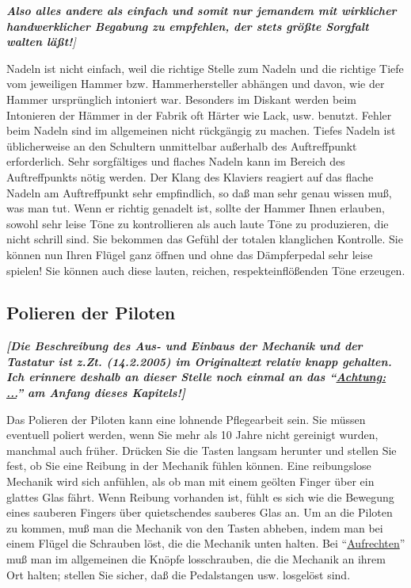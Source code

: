 \textit{\textbf{Also alles andere als einfach und somit nur jemandem mit wirklicher handwerklicher Begabung zu empfehlen, der stets größte Sorgfalt walten läßt!}]}

Nadeln ist nicht einfach, weil die richtige Stelle zum Nadeln und die richtige Tiefe vom jeweiligen Hammer bzw. Hammerhersteller abhängen und davon, wie der Hammer ursprünglich intoniert war.
 Besonders im Diskant werden beim Intonieren der Hämmer in der Fabrik oft Härter wie Lack, usw. benutzt.
 Fehler beim Nadeln sind im allgemeinen nicht rückgängig zu machen.
 Tiefes Nadeln ist üblicherweise an den Schultern unmittelbar außerhalb des Auftreffpunkt erforderlich.
 Sehr sorgfältiges und flaches Nadeln kann im Bereich des Auftreffpunkts nötig werden.
 Der Klang des Klaviers reagiert auf das flache Nadeln am Auftreffpunkt sehr empfindlich, so daß man sehr genau wissen muß, was man tut.
 Wenn er richtig genadelt ist, sollte der Hammer Ihnen erlauben, sowohl sehr leise Töne zu kontrollieren als auch laute Töne zu produzieren, die nicht schrill sind.
 Sie bekommen das Gefühl der totalen klanglichen Kontrolle.
 Sie können nun Ihren Flügel ganz öffnen und ohne das Dämpferpedal sehr leise spielen!
 Sie können auch diese lauten, reichen, respekteinflößenden Töne erzeugen.
 \hypertarget{c2_7b}{}\hypertarget{c2_7_pilo}{}

\subsection{Polieren der Piloten}

\textbf{\textit{{\normalsize [Die Beschreibung des  Aus- und Einbaus der Mechanik und der Tastatur ist z.Zt. (14.2.2005) im Originaltext relativ knapp gehalten.
 Ich erinnere deshalb an dieser Stelle noch einmal an das \enquote{\hyperlink{c2_1}{Achtung: ...}} am Anfang dieses Kapitels!]}}}

Das Polieren der Piloten kann eine lohnende Pflegearbeit sein.
 Sie müssen eventuell poliert werden, wenn Sie mehr als 10 Jahre nicht gereinigt wurden, manchmal auch früher.
 Drücken Sie die Tasten langsam herunter und stellen Sie fest, ob Sie eine Reibung in der Mechanik fühlen können.
 Eine reibungslose Mechanik wird sich anfühlen, als ob man mit einem geölten Finger über ein glattes Glas fährt.
 Wenn Reibung vorhanden ist, fühlt es sich wie die Bewegung eines sauberen Fingers über quietschendes sauberes Glas an.
 Um an die Piloten zu kommen, muß man die Mechanik von den Tasten abheben, indem man bei einem Flügel die Schrauben löst, die die Mechanik unten halten.
 Bei \enquote{\hyperlink{upright}{Aufrechten}} muß man im allgemeinen die Knöpfe losschrauben, die die Mechanik an ihrem Ort halten; stellen Sie sicher, daß die Pedalstangen usw. losgelöst sind.
 

